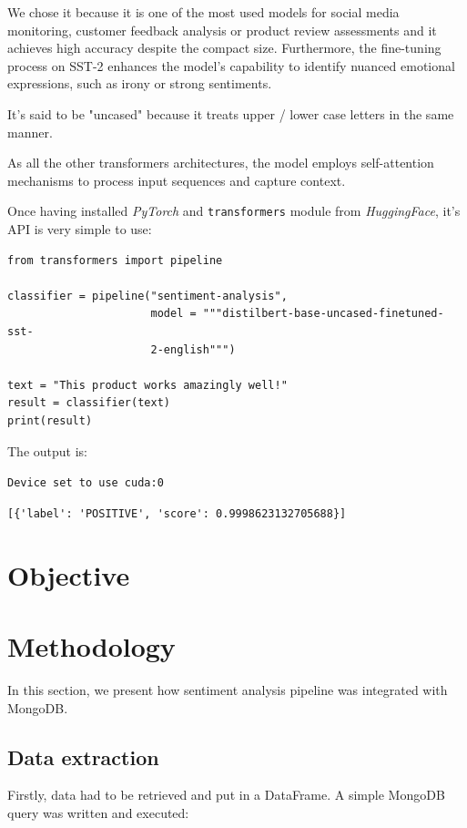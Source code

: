 \documentclass{Configuration_Files/PoliMi3i_thesis}
\begin{document}
We chose it because it is one of the most used models for social media monitoring, customer feedback analysis or product review assessments and it achieves high accuracy despite the compact size.
Furthermore, the fine-tuning process on SST-2 enhances the model's capability to identify nuanced emotional expressions, such as irony or strong sentiments. 

It's said to be "uncased" because it treats upper / lower case letters in the same manner.

As all the other transformers architectures, the model employs self-attention mechanisms to process input sequences and capture context.

Once having installed \textit{PyTorch} and \texttt{transformers} module from \textit{HuggingFace}, it's API is very simple to use:

\bigskip

\begin{verbatim}
from transformers import pipeline

classifier = pipeline("sentiment-analysis", 
                      model = """distilbert-base-uncased-finetuned-sst-
                      2-english""")

text = "This product works amazingly well!"
result = classifier(text)
print(result)
\end{verbatim}

\bigskip

The output is: 

\texttt{Device set to use cuda:0}

\verb|[{'label': 'POSITIVE', 'score': 0.9998623132705688}]|

\section{Objective}
\section{Methodology}
In this section, we present how sentiment analysis pipeline was integrated with MongoDB. 

\subsection{Data extraction}
Firstly, data had to be retrieved and put in a DataFrame. A simple MongoDB query was written and executed:
\end{document}
